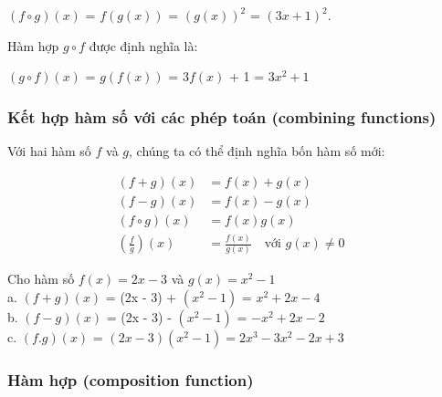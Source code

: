 \documentclass[a4paper,12pt,openany]{book}
\begin{document}
\begin{center}
    $(f \circ g)(x)$ = $f(g(x))$ = \((g(x))^2\) = \((3x + 1)^2\).
\end{center}

Hàm hợp $g \circ f$ được định nghĩa là:

\begin{center}
    $(g \circ f)(x)$ = $g(f(x))$ = 3$f(x)$ + 1 = \(3x^2 + 1\)
\end{center}

\subsubsection{Kết hợp hàm số với các phép toán (combining functions)}

Với hai hàm số $f$ và $g$, chúng ta có thể định nghĩa bốn hàm số mới:

\begin{align*} 
(f + g)(x) &= f(x) + g(x) \quad \\ 
(f - g)(x) &= f(x) - g(x) \quad \\ 
(f \circ g)(x) &= f(x)g(x) \quad \\ \left( \frac{f}{g} \right)(x) &= \frac{f(x)}{g(x)} \quad \text{với } g(x) \neq 0 \quad 
\end{align*} 

\clearpage

Cho hàm số $f(x) = 2x - 3$ và $g(x) = x^2 -1$ \\
a. $(f+g)(x)$ = (2x - 3) + $(x^2 - 1)$ = $x^2 + 2x -4$ \\
b. $(f-g)(x)$ = (2x - 3) - $(x^2 -1)$ = $-x^2 +2x -2$ \\
c. $(f.g)(x)$ = $(2x - 3)(x^2 - 1) = 2x^3 -3x^2 -2x +3$

\subsubsection{Hàm hợp (composition function)}
\end{document}
